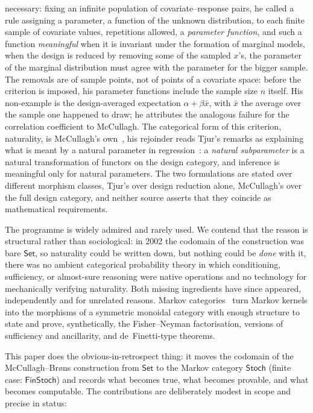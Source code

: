 \documentclass[11pt,a4paper]{article}
\theoremstyle{plain}
\theoremstyle{definition}
\theoremstyle{remark}
\newcommand{\cat}[1]{\mathsf{#1}}
\newcommand{\Set}{\cat{Set}}
\newcommand{\Stoch}{\cat{Stoch}}
\newcommand{\FinStoch}{\cat{FinStoch}}
\begin{document}
necessary: fixing an infinite population of covariate--response pairs, he called
a rule assigning a parameter, a function of the unknown distribution,
to each finite sample of covariate values, repetitions allowed, a
\emph{parameter function}, and such a function \emph{meaningful} when it is
invariant under the formation of marginal models, when the design is
reduced by removing some of the sampled $x$'s, the parameter of the marginal
distribution must agree with the parameter for the bigger sample. The
removals are of sample points, not of points of a covariate space: before
the criterion is imposed, his parameter functions include the sample size
$n$ itself.
His non-example is the design-averaged expectation $\alpha + \beta\bar x$,
with $\bar x$ the average over the sample one happened to draw; he attributes the
analogous failure for the correlation coefficient to McCullagh. The
categorical form of this criterion, naturality, is McCullagh's
own~\cite[\S4.5]{mccullagh_what_2002}, his rejoinder reads Tjur's remarks as
explaining what is meant by a natural parameter in
regression~\cite[p.~1304]{mccullagh_what_2002}: a \emph{natural subparameter} is a natural
transformation of functors on the design category, and inference is meaningful
only for natural parameters. The two formulations are stated over different
morphism classes, Tjur's over design reduction alone, McCullagh's over the
full design category, and neither source asserts that they coincide as
mathematical requirements.

The programme is widely admired and rarely used. We contend that the reason is
structural rather than sociological: in 2002 the codomain of the construction
was bare $\Set$, so naturality could be written down, but nothing could be
\emph{done} with it, there was no ambient categorical probability theory in
which conditioning, sufficiency, or almost-sure reasoning were native
operations and no technology for mechanically verifying naturality. Both
missing ingredients have since appeared, independently and for unrelated
reasons. Markov categories~\cite{fritz_synthetic_2020,cho_disintegration_2019,perrone_markov_2024,
fritz_definetti_2021} turn Markov kernels into the morphisms of a symmetric
monoidal category with enough structure to state and prove, synthetically, the
Fisher--Neyman factorisation, versions of sufficiency and ancillarity, and
de~Finetti-type theorems.

This paper does the obvious-in-retrospect thing: it moves the codomain of the
McCullagh--Br\o ns construction from $\Set$ to the Markov category $\Stoch$
(finite case: $\FinStoch$) and records what becomes true, what becomes
provable, and what becomes computable. The contributions are deliberately
modest in scope and precise in status:
\end{document}
